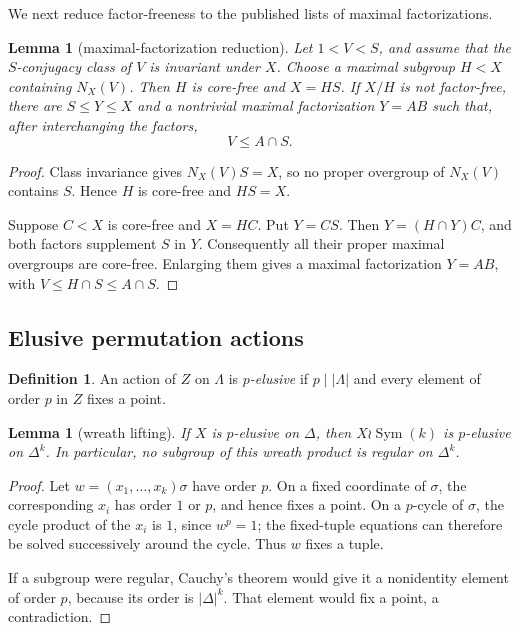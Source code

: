 \documentclass[11pt]{amsart}
\newcommand{\Sym}{\operatorname{Sym}}
\newtheorem{lemma}[theorem]{Lemma}
\theoremstyle{definition}
\newtheorem{definition}[theorem]{Definition}
\begin{document}
We next reduce factor-freeness to the published lists of maximal
factorizations.

\begin{lemma}[maximal-factorization reduction]\label{lem:max-factorization}
Let \(1<V<S\), and assume that the \(S\)-conjugacy class of \(V\) is
invariant under \(X\).  Choose a maximal subgroup \(H<X\) containing
\(N_X(V)\).  Then \(H\) is core-free and \(X=HS\).  If \(X/H\) is not
factor-free, there are \(S\leq Y\leq X\) and a nontrivial maximal
factorization \(Y=AB\) such that, after interchanging the factors,
\[
V\leq A\cap S.
\]
\end{lemma}

\begin{proof}
Class invariance gives \(N_X(V)S=X\), so no proper overgroup of \(N_X(V)\)
contains \(S\).  Hence \(H\) is core-free and \(HS=X\).

Suppose \(C<X\) is core-free and \(X=HC\).  Put \(Y=CS\).  Then
\(Y=(H\cap Y)C\), and both factors supplement \(S\) in \(Y\).  Consequently
all their proper maximal overgroups are core-free.  Enlarging them gives a
maximal factorization \(Y=AB\), with
\(V\leq H\cap S\leq A\cap S\).
\end{proof}

\subsection{Elusive permutation actions}

\begin{definition}
An action of \(Z\) on \(\Lambda\) is \emph{\(p\)-elusive} if
\(p\mid\lvert\Lambda\rvert\) and every element of order \(p\) in \(Z\)
fixes a point.
\end{definition}

\begin{lemma}[wreath lifting]\label{lem:elusive-wreath}
If \(X\) is \(p\)-elusive on \(\Delta\), then
\(X\wr\Sym(k)\) is \(p\)-elusive on \(\Delta^k\).  In particular, no
subgroup of this wreath product is regular on \(\Delta^k\).
\end{lemma}

\begin{proof}
Let \(w=(x_1,\ldots,x_k)\sigma\) have order \(p\).  On a fixed coordinate of
\(\sigma\), the corresponding \(x_i\) has order \(1\) or \(p\), and hence
fixes a point.  On a \(p\)-cycle of \(\sigma\), the cycle product of the
\(x_i\) is \(1\), since \(w^p=1\); the fixed-tuple equations can therefore
be solved successively around the cycle.  Thus \(w\) fixes a tuple.

If a subgroup were regular, Cauchy's theorem would give it a nonidentity
element of order \(p\), because its order is
\(\lvert\Delta\rvert^k\).  That element would fix a point, a contradiction.
\end{proof}
\end{document}
